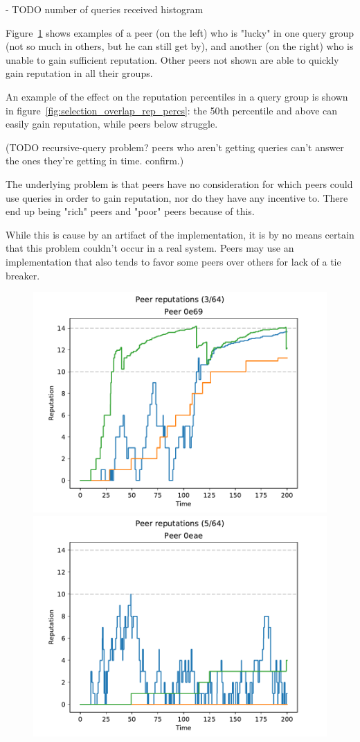 - TODO number of queries received histogram

Figure~\ref{fig:selection_overlap_peer_reps} shows examples of a peer (on the
left) who is "lucky" in one query group (not so much in others, but he can still
get by), and another (on the right) who is unable to gain sufficient reputation.
Other peers not shown are able to quickly gain reputation in all their groups.

An example of the effect on the reputation percentiles in a query group is shown
in figure~\ref{fig:selection_overlap_rep_percs}: the 50th percentile and above
can easily gain reputation, while peers below struggle.

(TODO recursive-query problem? peers who aren't getting queries can't answer the
ones they're getting in time. confirm.)

The underlying problem is that peers have no consideration for which peers could
use queries in order to gain reputation, nor do they have any incentive to.
There end up being "rich" peers and "poor" peers because of this.

While this is cause by an artifact of the implementation, it is by no means
certain that this problem couldn't occur in a real system. Peers may use an
implementation that also tends to favor some peers over others for lack of a tie
breaker.

\begin{figure}[t]
\centering
\includegraphics[width=0.49\columnwidth]{figures/selection_overlap_peer_reps_3_of_64}
\includegraphics[width=0.49\columnwidth]{figures/selection_overlap_peer_reps_5_of_64}
\label{fig:selection_overlap_peer_reps}
\end{figure}

